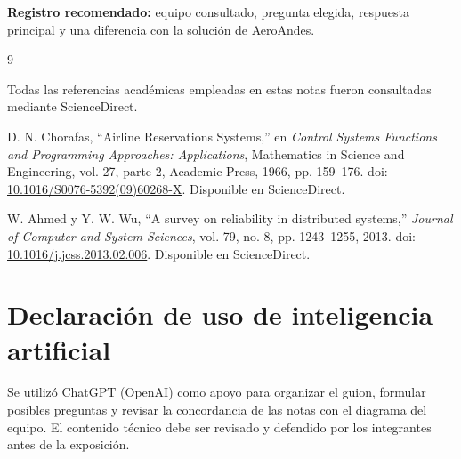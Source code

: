 \documentclass[11pt,a4paper]{article}
\begin{document}
\textbf{Registro recomendado:} equipo consultado, pregunta elegida, respuesta principal y una diferencia con la solución de AeroAndes.

\begin{thebibliography}{9}

\small Todas las referencias académicas empleadas en estas notas fueron consultadas mediante ScienceDirect.

D. N. Chorafas, ``Airline Reservations Systems,'' en \textit{Control Systems Functions and Programming Approaches: Applications}, Mathematics in Science and Engineering, vol. 27, parte 2, Academic Press, 1966, pp. 159--176. doi: \href{https://doi.org/10.1016/S0076-5392(09)60268-X}{10.1016/S0076-5392(09)60268-X}. Disponible en ScienceDirect.

W. Ahmed y Y. W. Wu, ``A survey on reliability in distributed systems,'' \textit{Journal of Computer and System Sciences}, vol. 79, no. 8, pp. 1243--1255, 2013. doi: \href{https://doi.org/10.1016/j.jcss.2013.02.006}{10.1016/j.jcss.2013.02.006}. Disponible en ScienceDirect.

\end{thebibliography}

\section*{Declaración de uso de inteligencia artificial}

Se utilizó ChatGPT (OpenAI) como apoyo para organizar el guion, formular posibles preguntas y revisar la concordancia de las notas con el diagrama del equipo. El contenido técnico debe ser revisado y defendido por los integrantes antes de la exposición.
\end{document}
